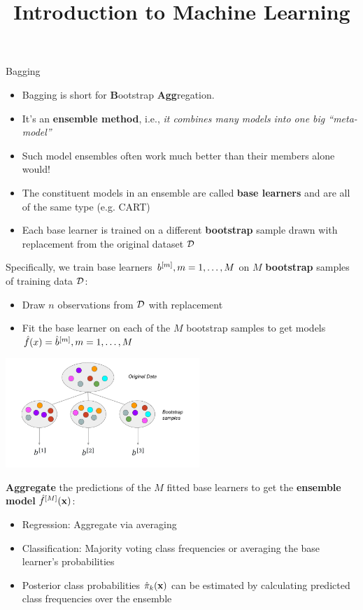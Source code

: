 \documentclass[11pt,compress,t,notes=noshow, xcolor=table]{beamer}
\title{Introduction to Machine Learning}
\institute{\href{https://compstat-lmu.github.io/lecture_i2ml/}{compstat-lmu.github.io/lecture\_i2ml}}
\date{}
\begin{document}
\sloppy


\begin{vbframe}{Bagging}

\begin{itemize}
  \item Bagging is short for \textbf{B}ootstrap \textbf{Agg}regation.
  \item It's an \textbf{ensemble method}, i.e., \textit{it combines many models into one big \enquote{meta-model}}
  \item Such model ensembles often work much better than their members alone would!
  \item The constituent models in an ensemble are called \textbf{base learners} and are all of the same type (e.g. CART)
  \item Each base learner is trained on a different \textbf{bootstrap} sample drawn with replacement from the original dataset $\mathcal{D}$
\end{itemize}

\framebreak 
Specifically, we train base learners $b^{[m]}, m = 1, \dots, M$ on $M$ \textbf{bootstrap} samples of training data $\mathcal{D}$:
\begin{itemize}
  \item Draw $n$ observations from $\mathcal{D}$ with replacement
  \item Fit the base learner on each of the $M$ bootstrap samples to get models $\hat{f}(x) = \hat{b}^{[m]}, m = 1, \dots, M$
\end{itemize}

\begin{center}
\includegraphics[width=0.55\textwidth]{figure_man/bagging.pdf}
\end{center}

\framebreak

\textbf{Aggregate} the predictions of the $M$ fitted base learners to get the
\textbf{ensemble model} $\hat f^{[M]}(\mathbf{x})$:
  \begin{itemize}
    \item Regression: Aggregate via averaging
    \item Classification: Majority voting class frequencies or averaging the base learner's probabilities
    \item Posterior class probabilities $\hat \pi_{k}(\mathbf{x})$ can be estimated by calculating predicted class frequencies over the ensemble
  \end{itemize}


\end{vbframe}
\end{document}
